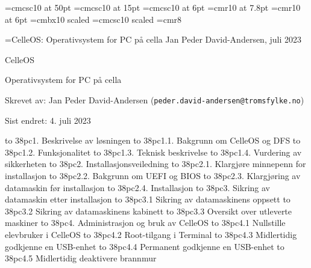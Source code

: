 



\font\ftitteltop=cmcsc10 at 50pt
\font\ftittelbottom=cmcsc10 at 15pt
\font\ftopptekst=cmcsc10 at 6pt
\font\ftopptekststor=cmr10 at 7.8pt
\font\fforfatter=cmr10 at 6pt
\font\fs=cmbx10 scaled
\font\fss=cmcsc10 scaled
\font\fc=cmr8

\def\imagewithcaption#1#2#3{
\centerline{
\vbox{\hbox{\epsfxsize #1 \epsffile{#2}}
\vskip 2pt
\hbox{\raise 4pt \vbox{\hsize=#1 \noindent \fc \baselineskip=9pt #3}}}}}

\headline={\ftopptekst CelleOS: Operativsystem for PC p\aa{} cella \hfill \fforfatter Jan Peder David-Andersen, juli 2023}

\topglue 6pc
\centerline{\ftitteltop CelleOS}
\vskip 12pt
\centerline{\ftittelbottom Operativsystem for PC p\aa{} cella}
\vskip 8pc

\noindent Skrevet av: Jan Peder David-Andersen ({\tt peder.david-andersen@tromsfylke.no})

\noindent Sist endret: 4. juli 2023

\vskip 3pc
\def\tocwidth{38pc}


\hbox to \tocwidth{1. Beskrivelse av l\o sningen }
\smallskip
\hbox to \tocwidth{1.1. Bakgrunn om CelleOS og DFS }
\hbox to \tocwidth{1.2. Funksjonalitet }
\hbox to \tocwidth{1.3. Teknisk beskrivelse }
\hbox to \tocwidth{1.4. Vurdering av sikkerheten }
\medskip
\hbox to \tocwidth{2. Installasjonsveiledning }
\smallskip
\hbox to \tocwidth{2.1. Klargj\o re minnepenn for installasjon }
\hbox to \tocwidth{2.2. Bakgrunn om UEFI og BIOS }
\hbox to \tocwidth{2.3. Klargj\o ring av datamaskin f\o r installasjon }
\hbox to \tocwidth{2.4. Installasjon }
\medskip
\hbox to \tocwidth{3. Sikring av datamaskin etter installasjon }
\smallskip
\hbox to \tocwidth{3.1 Sikring av datamaskinens oppsett }
\hbox to \tocwidth{3.2 Sikring av datamaskinens kabinett }
\hbox to \tocwidth{3.3 Oversikt over utleverte maskiner }
\medskip
\hbox to \tocwidth{4. Administrasjon og bruk av CelleOS }
\smallskip
\hbox to \tocwidth{4.1 Nullstille elevbruker i CelleOS }
\hbox to \tocwidth{4.2 Root-tilgang i Terminal }
\hbox to \tocwidth{4.3 Midlertidig godkjenne en USB-enhet }
\hbox to \tocwidth{4.4 Permanent godkjenne en USB-enhet }
\hbox to \tocwidth{4.5 Midlertidig deaktivere brannmur }



